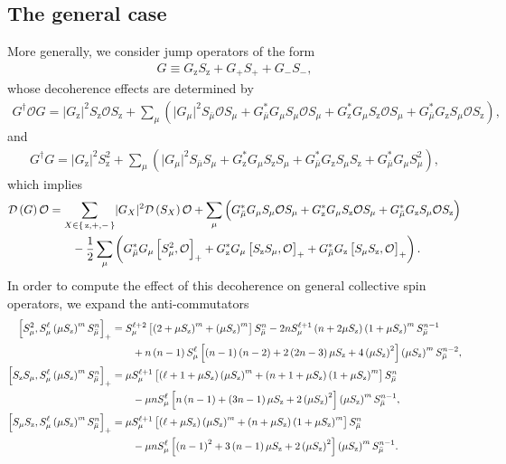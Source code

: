 \documentclass[aps,pra,twocolumn,longbibliography]{revtex4-2}
\newcommand{\f}[2]{\dfrac{#1}{#2}} %
\newcommand{\p}[1]{\left( #1 \right)} %
\renewcommand{\sp}[1]{\left[ #1 \right]} %
\renewcommand{\abs}[1]{\lvert #1 \rvert}
\newcommand{\D}{\mathcal{D}}
\renewcommand{\O}{\mathcal{O}}
\newcommand{\z}{\text{z}}
\newcommand{\bmu}{{\bar\mu}}
\newcommand{\1}{\mathds{1}}
\begin{document}
\subsection{The general case}
\label{sec:general_collective}

More generally, we consider jump operators of the form
\begin{align}
  G \equiv G_\z S_\z + G_+ S_+ + G_- S_-,
\end{align}
whose decoherence effects are determined by
\begin{align}
  G^\dag \O G
  = \abs{G_\z}^2 S_\z \O S_\z
  + \sum_\mu \p{\abs{G_\mu}^2 S_\bmu \O S_\mu
    + G_\bmu^* G_\mu S_\mu \O S_\mu
    + G_\z^* G_\mu S_\z \O S_\mu
    + G_\bmu^* G_\z S_\mu \O S_\z},
\end{align}
and
\begin{align}
  G^\dag G
  = \abs{G_\z}^2 S_\z^2
  + \sum_\mu \p{\abs{G_\mu}^2 S_\bmu S_\mu
    + G_\z^*G_\mu S_\z S_\mu
    + G_\bmu^* G_\z S_\mu S_\z
    + G_\bmu^* G_\mu S_\mu^2},
\end{align}
which implies
\begin{align}
  \D\p{G} \O
  &= \sum_{X\in\set{\z,+,-}} \abs{G_X}^2 \D\p{S_X} \O
  + \sum_\mu \p{G_\bmu^* G_\mu S_\mu \O S_\mu
    + G_\z^* G_\mu S_\z \O S_\mu
    + G_\bmu^* G_\z S_\mu \O S_\z}
  \notag \\
  &\qquad -\f12 \sum_\mu\p{G_\bmu^* G_\mu \sp{S_\mu^2, \O}_+
    + G_\z^*G_\mu \sp{S_\z S_\mu, \O}_+
    + G_\bmu^* G_\z \sp{S_\mu S_\z, \O}_+}.
\end{align}
In order to compute the effect of this decoherence on general
collective spin operators, we expand the anti-commutators
\begin{align}
  \sp{S_\mu^2, S_\mu^\ell \p{\mu S_\z}^m S_\bmu^n}_+
  &= S_\mu^{\ell+2} \sp{\p{2+\mu S_\z}^m+\p{\mu S_\z}^m} S_\bmu^n
  - 2n S_\mu^{\ell+1} \p{n+2\mu S_\z} \p{1+\mu S_\z}^m S_\bmu^{n-1}
  \notag \\
  &\qquad + n\p{n-1} S_\mu^\ell \sp{\p{n-1}\p{n-2}
    + 2\p{2n-3}\mu S_\z + 4\p{\mu S_\z}^2} \p{\mu S_\z}^m S_\bmu^{n-2},
  \allowdisplaybreaks \\
  \sp{S_\z S_\mu, S_\mu^\ell \p{\mu S_\z}^m S_\bmu^n}_+
  &= \mu S_\mu^{\ell+1} \sp{\p{\ell+1+\mu S_\z}\p{\mu S_\z}^m
    + \p{n+1+\mu S_\z} \p{1+\mu S_\z}^m } S_\bmu^n \notag \\
  &\qquad - \mu n S_\mu^\ell \sp{n \p{n-1}
    + \p{3n-1}\mu S_\z + 2\p{\mu S_\z}^2} \p{\mu S_\z}^m S_\bmu^{n-1},
  \allowdisplaybreaks \\
  \sp{S_\mu S_\z, S_\mu^\ell \p{\mu S_\z}^m S_\bmu^n}_+
  &= \mu S_\mu^{\ell+1} \sp{\p{\ell+\mu S_\z}\p{\mu S_\z}^m
    + \p{n+\mu S_\z} \p{1+\mu S_\z}^m} S_\bmu^n \notag \\
  &\qquad - \mu n S_\mu^\ell \sp{\p{n-1}^2
    + 3\p{n-1}\mu S_\z + 2\p{\mu S_\z}^2} \p{\mu S_\z}^m S_\bmu^{n-1}.
\end{align}
\end{document}
